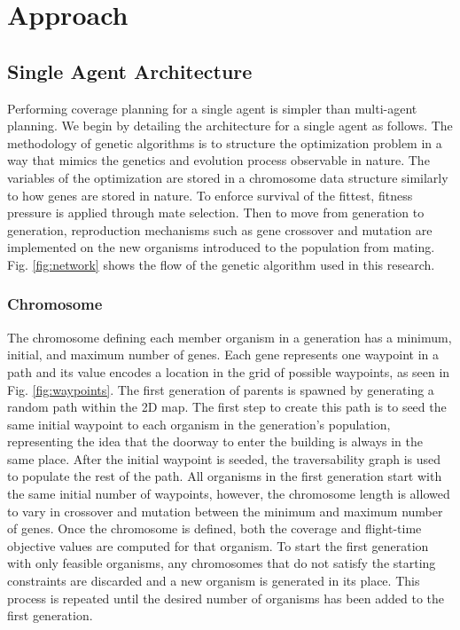 \documentclass[letterpaper, 10 pt, conference]{ieeeconf}  %
\begin{document}
\section{Approach}\label{approach}
\subsection{Single Agent Architecture}

Performing coverage planning for a single agent is simpler than multi-agent planning. We begin by detailing the architecture for a single agent as follows. The methodology of genetic algorithms is to structure the optimization problem in a way that mimics the genetics and evolution process observable in nature. The variables of the optimization are stored in a chromosome data structure similarly to how genes are stored in nature. To enforce survival of the fittest, fitness pressure is applied through mate selection. Then to move from generation to generation, reproduction mechanisms such as gene crossover and mutation are implemented on the new organisms introduced to the population from mating. Fig. \ref{fig:network} shows the flow of the genetic algorithm used in this research.

\subsubsection{Chromosome}

The chromosome defining each member organism in a generation has a minimum, initial, and maximum number of genes. Each gene represents one waypoint in a path and its value encodes a location in the grid of possible waypoints, as seen in Fig. \ref{fig:waypoints}. The first generation of parents is spawned by generating a random path within the 2D map. The first step to create this path is to seed the same initial waypoint to each organism in the generation's population, representing the idea that the doorway to enter the building is always in the same place. After the initial waypoint is seeded, the traversability graph is used to populate the rest of the path. All organisms in the first generation start with the same initial number of waypoints, however, the chromosome length is allowed to vary in crossover and mutation between the minimum and maximum number of genes. Once the chromosome is defined, both the coverage and flight-time objective values are computed for that organism. To start the first generation with only feasible organisms, any chromosomes that do not satisfy the starting constraints are discarded and a new organism is generated in its place. This process is repeated until the desired number of organisms has been added to the first generation.
\end{document}
